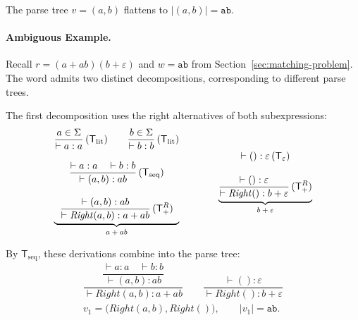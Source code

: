The parse tree $v=(a,b)$ flattens to $\lvert (a,b)\rvert = \mathtt{ab}$.

%

\paragraph{Ambiguous Example.}
\label{par:ambiguous-example}

Recall $r = (a+ab)(b+\varepsilon)$ and $w = \mathtt{ab}$ 
from Section~\ref{sec:matching-problem}. 
The word admits two distinct decompositions, 
corresponding to different parse trees.

The first decomposition uses the right alternatives of both subexpressions:
\[
\begin{array}{c@{\qquad\qquad}c}
\underbrace{
\begin{gathered}
\dfrac{a \in \Sigma}{\vdash a : a}
\,(\mathsf{T}_{\mathrm{lit}})
\qquad
\dfrac{b \in \Sigma}{\vdash b : b}
\,(\mathsf{T}_{\mathrm{lit}})
\\[1em]
\dfrac{\vdash a : a \quad \vdash b : b}
      {\vdash (a,b) : ab}
\,(\mathsf{T}_{\mathrm{seq}})
\\[1em]
\dfrac{\vdash (a,b) : ab}
      {\vdash \mathit{Right}(a,b) : a+ab}
\,(\mathsf{T}_{+}^{R})
\end{gathered}
}_{\text{$a+ab$}}
&
\underbrace{
\begin{gathered}
\vdash () : \varepsilon
\,(\mathsf{T}_{\varepsilon})
\\[1em]
\dfrac{\vdash () : \varepsilon}
      {\vdash \mathit{Right}() : b+\varepsilon}
\,(\mathsf{T}_{+}^{R})
\end{gathered}
}_{\text{$b+\varepsilon$}}
\end{array}
\]

By $\mathsf{T}_{\mathrm{seq}}$, these derivations combine into the parse tree:
\begin{equation}
\label{eq:decomposition-right}
\begin{gathered}
\dfrac{
  \dfrac{\vdash a : a \quad \vdash b : b}
        {\vdash (a,b) : ab}
}{
  \vdash \mathit{Right}(a,b) : a+ab
}
\qquad
\dfrac{\vdash () : \varepsilon}
      {\vdash \mathit{Right}() : b+\varepsilon}
\\[1em]
v_1 =
\bigl(\mathit{Right}(a,b),\mathit{Right}()\bigr),
\qquad
|v_1| = \mathtt{ab}.
\end{gathered}
\end{equation}

